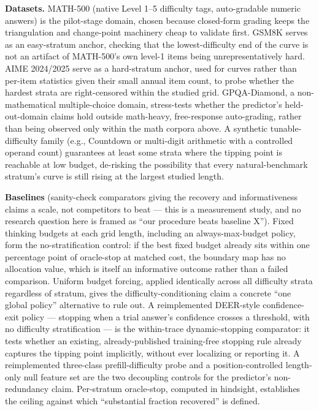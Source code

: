 \documentclass[11pt]{article}
\begin{document}
\textbf{Datasets.} MATH-500 (native Level 1--5 difficulty tags, auto-gradable numeric answers) is the pilot-stage domain, chosen because closed-form grading keeps the triangulation and change-point machinery cheap to validate first. GSM8K serves as an easy-stratum anchor, checking that the lowest-difficulty end of the curve is not an artifact of MATH-500's own level-1 items being unrepresentatively hard. AIME 2024/2025 serve as a hard-stratum anchor, used for curves rather than per-item statistics given their small annual item count, to probe whether the hardest strata are right-censored within the studied grid. GPQA-Diamond, a non-mathematical multiple-choice domain, stress-tests whether the predictor's held-out-domain claims hold outside math-heavy, free-response auto-grading, rather than being observed only within the math corpora above. A synthetic tunable-difficulty family (e.g., Countdown or multi-digit arithmetic with a controlled operand count) guarantees at least some strata where the tipping point is reachable at low budget, de-risking the possibility that every natural-benchmark stratum's curve is still rising at the largest studied length.

\textbf{Baselines} (sanity-check comparators giving the recovery and informativeness claims a scale, not competitors to beat --- this is a measurement study, and no research question here is framed as ``our procedure beats baseline X''). Fixed thinking budgets at each grid length, including an always-max-budget policy, form the no-stratification control: if the best fixed budget already sits within one percentage point of oracle-stop at matched cost, the boundary map has no allocation value, which is itself an informative outcome rather than a failed comparison. Uniform budget forcing, applied identically across all difficulty strata regardless of stratum, gives the difficulty-conditioning claim a concrete ``one global policy'' alternative to rule out. A reimplemented DEER-style confidence-exit policy \cite{DEERNpU7} --- stopping when a trial answer's confidence crosses a threshold, with no difficulty stratification --- is the within-trace dynamic-stopping comparator: it tests whether an existing, already-published training-free stopping rule already captures the tipping point implicitly, without ever localizing or reporting it. A reimplemented three-class prefill-difficulty probe and a position-controlled length-only null feature set are the two decoupling controls for the predictor's non-redundancy claim. Per-stratum oracle-stop, computed in hindsight, establishes the ceiling against which ``substantial fraction recovered'' is defined.
\end{document}
